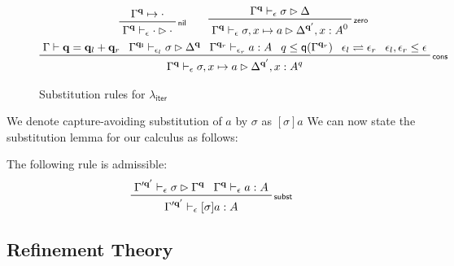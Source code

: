 \documentclass[acmsmall,screen,review]{acmart}
\newcommand{\mb}[1]{\ensuremath{\mathbf{#1}}}
\newcommand{\ms}[1]{\ensuremath{\mathsf{#1}}}
\newcommand{\qsp}[4]{#1 \vdash #2 = #3 + #4}
\newcommand{\cwk}[2]{#1 \mapsto #2}
\newcommand{\rle}[1]{{\scriptsize\textsf{#1}}}
\newcommand{\hasty}[4]{#1 \vdash_{#2} #3: {#4}}
\newcommand{\issubst}[4]{#1 \vdash_{#2} #3 \rhd #4}
\newcommand{\subiterexp}{\texorpdfstring{\(\lambda_{\ms{iter}}\)}{lambda-iter}}
\newcommand{\slides}{\rightleftharpoons}
\newcommand{\alquant}{\ms{q}}
\begin{document}
\begin{figure}
  \begin{adjustbox}{minipage=1.1\textwidth,scale=0.9}
  \begin{gather*}
    \prftree[r]{\rle{nil}}{\cwk{\Gamma^{\mb{q}}}{\cdot}}
                              {\issubst{\Gamma^{\mb{q}}}{\epsilon}{\cdot}{\cdot}} \qquad 
    \prftree[r]{\rle{zero}}
      {\issubst{\Gamma^{\mb{q}}}{\epsilon}{\sigma}{\Delta}}
      {\issubst{\Gamma^{\mb{q}}}{\epsilon}{\sigma, x \mapsto a}{\Delta^{\mb{q}'}, x : A^0}}
    \\
    \prftree[r]{\rle{cons}}
      {\qsp{\Gamma}{\mb{q}}{\mb{q}_l}{\mb{q}_r}}
      {\issubst{\Gamma^{\mb{q_l}}}{\epsilon_l}{\sigma}{\Delta^{\mb{q}}}}
      {\hasty{\Gamma^{\mb{q}_r}}{\epsilon_r}{a}{A}}
      {q \leq \alquant(\Gamma^{\mb{q}_r})}
      {\epsilon_l \slides \epsilon_r}
      {\epsilon_l, \epsilon_r \leq \epsilon}
      {\issubst{\Gamma^{\mb{q}}}{\epsilon}{\sigma, x \mapsto a}
      {\Delta^{\mb{q}'}, x : A^q}}
  \end{gather*}
  \end{adjustbox}
  \caption{Substitution rules for \subiterexp{}}
  \Description{}
  \label{fig:expr-subst}
\end{figure}%
We denote capture-avoiding substitution of $a$ by $\sigma$ as $[\sigma]a$ We can now state the
substitution lemma for our calculus as follows:
\begin{lemma}[name=Substitution, restate=synmonsubst]
  The following rule is admissible:
  \begin{equation*}
    \prftree[r]{\rle{subst}}
      {\issubst{\Gamma'^{\mb{q}'}}{\epsilon}{\sigma}{\Gamma^{\mb{q}}}}
      {\hasty{\Gamma^{\mb{q}}}{\epsilon}{a}{A}}
      {\hasty{\Gamma'^{\mb{q}'}}{\epsilon}{[\sigma]a}{A}}
  \end{equation*}
\end{lemma}

\subsection{Refinement Theory}

\label{ssec:refinement-theory}
\end{document}
